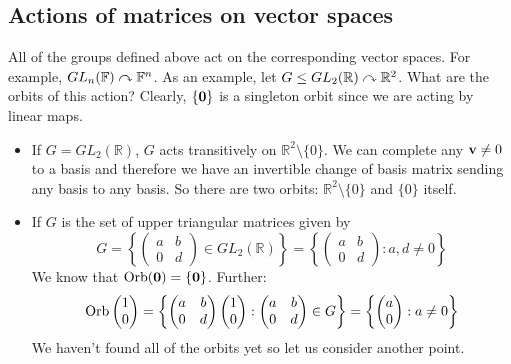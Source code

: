 \subsection{Actions of matrices on vector spaces}
All of the groups defined above act on the corresponding vector spaces.
For example, \(GL_n(\mathbb F) \curvearrowright \mathbb F^n\).
As an example, let \(G \leq GL_2(\mathbb R) \curvearrowright \mathbb R^2\).
What are the orbits of this action?
Clearly, \(\{ \vb 0 \}\) is a singleton orbit since we are acting by linear maps.
\begin{itemize}
	\item If \(G = GL_2(\mathbb R)\), \(G\) acts transitively on \(\mathbb R^2 \setminus \{ 0 \}\).
	      We can complete any \(\vb v \neq 0\) to a basis and therefore we have an invertible change of basis matrix sending any basis to any basis.
	      So there are two orbits: \(\mathbb R^2 \setminus \{ 0 \}\) and \(\{ 0 \}\) itself.
	\item If \(G\) is the set of upper triangular matrices given by
	      \[
		      G = \left\{ \begin{pmatrix}
			      a & b \\ 0 & d
		      \end{pmatrix} \in GL_2(\mathbb R) \right\} = \left\{ \begin{pmatrix}
			      a & b \\ 0 & d
		      \end{pmatrix}: a, d \neq 0 \right\}
	      \]
	      We know that \(\operatorname{Orb}(\vb 0) = \{ \vb 0 \}\).
	      Further:
	      \[
		      \operatorname{Orb}\begin{pmatrix}
			      1 \\ 0
		      \end{pmatrix} = \left\{ \begin{pmatrix}
			      a & b \\ 0 & d
		      \end{pmatrix} \begin{pmatrix}
			      1 \\ 0
		      \end{pmatrix}: \begin{pmatrix}
			      a & b \\ 0 & d
		      \end{pmatrix} \in G \right\} = \left\{ \begin{pmatrix}
			      a \\ 0
		      \end{pmatrix}: a \neq 0 \right\}
	      \]
	      We haven't found all of the orbits yet so let us consider another point.

\end{itemize}
